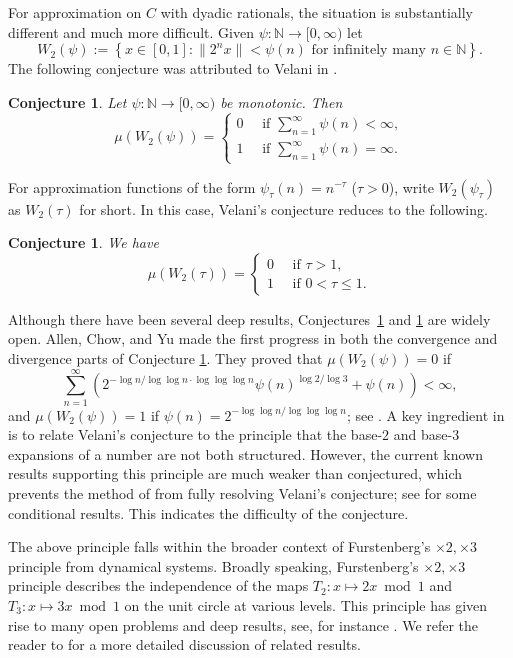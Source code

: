 \documentclass[amssymb,amsfonts,refcheck,12pt,verbatim,righttag]{amsart}
\numberwithin{equation}{section} %
\newtheorem{conj}[thm]{Conjecture}
\newtheorem{specialcon}{Conjecture}
\newcommand{\N}{\mathbb{N}}
\theoremstyle{plain}
\begin{document}
For approximation on $C$ with dyadic rationals, the situation is substantially different and much more difficult. Given $\psi:\N\to [0,\infty)$ let 
\begin{equation}\label{eqW2psi}
W_2(\psi):=\left\{x\in [0,1]: \|2^nx\|< \psi(n)\text{ for infinitely many   }n\in\N\right\}.
\end{equation}
The following conjecture was attributed to Velani in  \cite{ACY24}. 
\begin{conj}
\label{ConjVelani}
Let $\psi:\N\to [0,\infty)$ be monotonic. Then 
\[\mu(W_2(\psi))=\begin{cases}
	0 \quad  \text{ if }\sum_{n=1}^{\infty}\psi(n)<\infty,\\
	1 \quad \text{ if }\sum_{n=1}^{\infty}\psi(n)=\infty.
\end{cases}\]
\end{conj}
For approximation functions of the form $\psi_{\tau}(n)=n^{-\tau}$ ($\tau> 0$), write $W_2(\psi_{\tau})$ as $W_2(\tau)$ for short. In this case,  Velani's conjecture reduces to the following. 
\begin{specialcon}
\label{ConjVelanitau}
We have \[\mu(W_2(\tau))=\begin{cases}
	0 \quad  \text{ if }\tau>1,\\
	1 \quad \text{ if }0<\tau\leq 1.
\end{cases}\]
\end{specialcon}

Although there have been several deep results, Conjectures~\ref{ConjVelani} and \ref{ConjVelanitau} are widely open. Allen, Chow, and Yu \cite{ACY24} made the first progress in both the convergence and divergence parts of Conjecture \ref{ConjVelani}.  They proved that $\mu(W_{2}(\psi))=0$ if 
$$\sum_{n=1}^{\infty}\left(2^{-\log n/\log \log n \cdot \log \log \log n}\psi(n)^{\log 2/\log 3}+\psi(n)\right)<\infty,$$
and $\mu(W_{2}(\psi))=1$ if $\psi(n)=2^{-\log \log n/\log \log \log n}$; see \cite[Theorems 1.5, 1.9]{ACY24}.
A key ingredient in \cite{ACY24} is to relate   Velani's conjecture to the principle that the base-$2$ and base-$3$ expansions of a number are not both structured. However, the current known results supporting this principle are much weaker than conjectured, which prevents the method of \cite{ACY24} from fully resolving Velani's conjecture; see \cite[Section 5]{ACY24} for some conditional results. This indicates the difficulty of the conjecture. 

The above principle  falls within the broader context of  Furstenberg's $\times 2, \times 3$ principle from dynamical systems. Broadly speaking, Furstenberg's $\times 2, \times 3$ principle describes the independence of the maps $T_2: x\mapsto 2x\bmod1$ and $T_3: x\mapsto 3x\bmod1$ on the unit circle  at various levels. This principle has given rise to  many open problems and deep results, see, for instance \cite{Furstenberg67,Host95,HS15E,Shmerkin19,Wu19A,CLW26}.  We refer the reader to \cite[Section 1]{Baker25A} for a more detailed discussion of related  results. 
\end{document}
